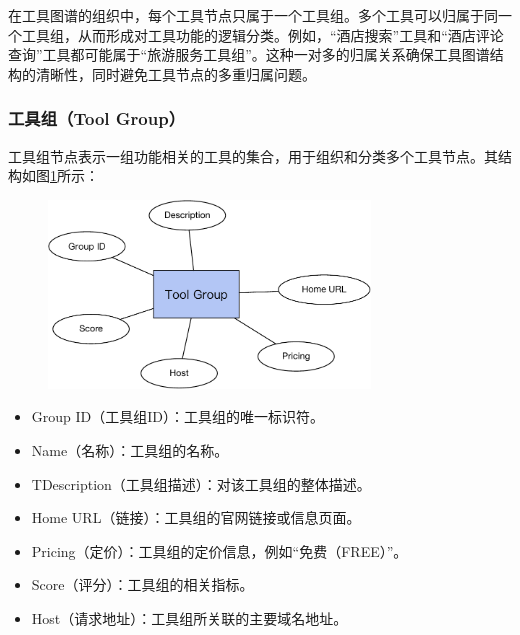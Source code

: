 在工具图谱的组织中，每个工具节点只属于一个工具组。多个工具可以归属于同一个工具组，从而形成对工具功能的逻辑分类。例如，“酒店搜索”工具和“酒店评论查询”工具都可能属于“旅游服务工具组”。这种一对多的归属关系确保工具图谱结构的清晰性，同时避免工具节点的多重归属问题。

\subsubsection{工具组（Tool Group）}

工具组节点表示一组功能相关的工具的集合，用于组织和分类多个工具节点。其结构如图\ref{fig:ch3-kg-tool-group}所示：

\begin{figure}[H]
    \vspace{1em}
    \centering
    \setlength{\abovecaptionskip}{10pt} %
    \includegraphics[height=5cm]{../assets/图谱格式-tool group.pdf}
    \label{fig:ch3-kg-tool-group}
  \end{figure}

\begin{itemize}
    \item Group ID（工具组ID）：工具组的唯一标识符。
    \item Name（名称）：工具组的名称。
    \item TDescription（工具组描述）：对该工具组的整体描述。
    \item Home URL（链接）：工具组的官网链接或信息页面。
    \item Pricing（定价）：工具组的定价信息，例如``免费（FREE）''。
    \item Score（评分）：工具组的相关指标。
    \item Host（请求地址）：工具组所关联的主要域名地址。
\end{itemize}

